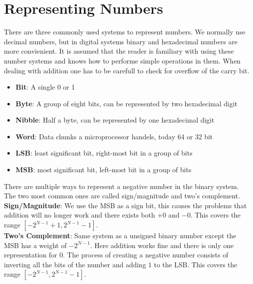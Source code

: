 \pagebreak

\section{Representing Numbers}

There are three commonly used systems to represent numbers. We normally use decimal numbers, but
in digital systems binary and hexadecimal numbers are more convienient. It is assumed that the reader
is familiary with using these number systems and knows how to performe simple operations in them. When
dealing with addition one has to be carefull to check for overflow of the carry bit.

\begin{satz}
    \begin{itemize}
        \item \textbf{Bit}: A single 0 or 1
        \item \textbf{Byte}: A group of eight bits, can be represented by two hexadecimal digit
        \item \textbf{Nibble}: Half a byte, can be represented by one hexadecimal digit
        \item \textbf{Word}: Data chunks a microprocessor handels, today 64 or 32 bit
        \item \textbf{LSB}: least significant bit, right-most bit in a group of bits
        \item \textbf{MSB}: most significant bit, left-most bit in a group of bits
    \end{itemize}
\end{satz}

There are multiple ways to represent a negative number in the binary system. The two most common ones are
called sign/magnitude and two's complement. \\

\textbf{Sign/Magnitude}: We use the MSB as a sign bit, this causes the problems that addition will no longer work
and there exists both $+0$ and $-0$. This covers the range $[-2^{N-1}+1, 2^{N-1}-1]$. \\

\textbf{Two's Complement}: Same system as a unsigned binary number except the MSB has a weight of $-2^{N-1}$.
Here addition works fine and there is only one representation for $0$. The process of creating a negative number
consists of inverting all the bits of the number and adding $1$ to the LSB. This covers the range $[-2^{N-1}, 2^{N-1}-1]$.

